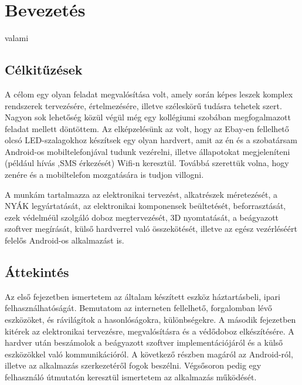 \documentclass[../main.tex]{subfiles}
\begin{document}
\section{Bevezetés}
valami

\subsection{Célkitűzések}
A célom egy olyan feladat megvalósítása volt, amely során képes leszek komplex rendszerek tervezésére, értelmezésére, illetve széleskörű tudásra tehetek szert. Nagyon sok lehetőség közül végül még egy kollégiumi szobában megfogalmazott feladat mellett döntöttem. 
Az elképzelésünk az volt, hogy az Ebay-en fellelhető olcsó LED-szalagokhoz készítsek egy olyan hardvert, amit az én és a szobatársam Android-os mobiltelefonjával tudunk vezérelni, illetve állapotokat megjeleníteni (például hívás ,SMS érkezését) Wifi-n keresztül. Továbbá szerettük volna, hogy zenére és a mobiltelefon mozgatására is tudjon villogni. 

A munkám tartalmazza az elektronikai tervezést, alkatrészek méretezését, a NYÁK legyártatását, az elektronikai komponensek beültetését, beforrasztását, ezek védelméül szolgáló doboz megtervezését, 3D nyomtatását, a beágyazott szoftver megírását, külső hardverrel való összekötését, illetve az egész vezérléséért felelős Android-os alkalmazást is. 

\subsection{Áttekintés}
Az első fejezetben ismertetem az általam készített eszköz háztartásbeli, ipari felhasználhatóságát. Bemutatom az interneten fellelhető, forgalomban lévő eszközöket, és rávilágítok a hasonlóságokra, különbségekre.
A második fejezetben kitérek az elektronikai tervezésre, megvalósításra és a védődoboz elkészítésére.
A hardver után beszámolok a beágyazott szoftver implementációjáról és a külső eszközökkel való kommunikációról.
A következő részben magáról az Android-ról, illetve az alkalmazás szerkezetéről fogok beszélni. Végsősoron pedig egy felhasználó útmutatón keresztül ismertetem az alkalmazás működését.
\end{document}
